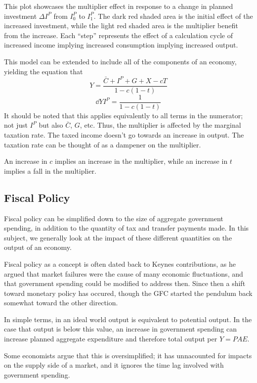 \documentclass[12pt]{report}
\begin{document}
\begin{flushleft}
This plot showcases the multiplier effect in response to a change in planned
investment \(\Delta I^P\) from \(I^P_0\) to \(I^P_1\). The dark red shaded 
area is the initial effect of the increased investment, while the light red 
shaded area is the multiplier benefit from the increase. Each ``step'' 
represents the effect of a calculation cycle of increased income implying 
increased consumption implying increased output. \par
This model can be extended to include all of the components of an economy, 
yielding the equation that
\[Y  = \frac{\bar{C} + I^P + G + X - cT}{1  - c(1 - t)}\]
\[\dd{Y}{I^P} = \frac{1}{1 - c(1 - t)}\]
It should be noted that this applies equivalently to all terms in the 
numerator; not just \(I^P\) but also \(\bar{C}\), \(G\), etc. Thus, the 
multiplier is affected by the marginal taxation rate. The taxed income doesn't
go towards an increase in output. The taxation rate can be thought of as a 
dampener on the multiplier. \par
An increase in \(c\) implies an increase in the multiplier, while an increase
in \(t\) implies a fall in the multiplier.

\subsection*{Fiscal Policy}

Fiscal policy can be simplified down to the size of aggregate government
spending, in addition to the quantity of tax and transfer payments made. In
this subject, we generally look at the impact of these different quantities on
the output of an economy. \par
Fiscal policy as a concept is often dated back to Keynes contributions, as
he argued that market failures were the cause of many economic fluctuations,
and that government spending could be modified to address then. Since then a
shift toward monetary policy has occured, though the GFC started the pendulum
back somewhat toward the other direction. \par
In simple terms, in an ideal world output is equivalent to potential output. In
the case that output is below this value, an increase in government spending
can increase planned aggregate expenditure and therefore total output per 
\(Y = PAE\). \par
Some economists argue that this is oversimplified; it has unnacounted for
impacts on the supply side of a market, and it ignores the time lag involved
with government spending.


\end{flushleft}
\end{document}

